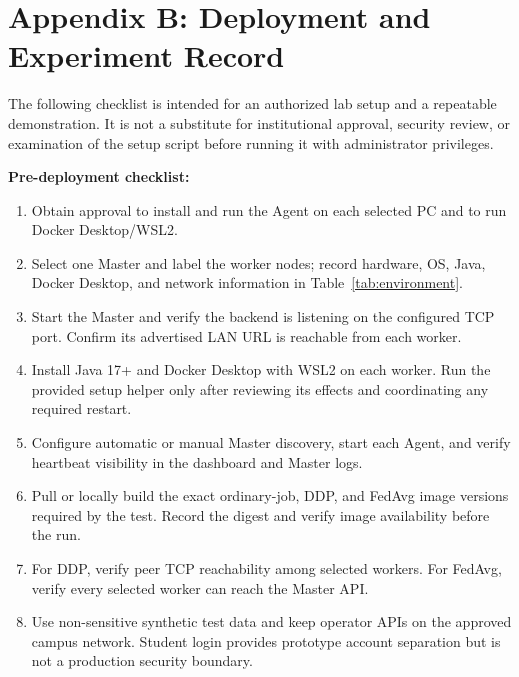 \documentclass{article}
\begin{document}
\pagebreak
\section{Appendix B: Deployment and Experiment Record}
The following checklist is intended for an authorized lab setup and a repeatable demonstration. It is not a substitute for institutional approval, security review, or examination of the setup script before running it with administrator privileges.

\textbf{Pre-deployment checklist:}
\begin{enumerate}
  \item Obtain approval to install and run the Agent on each selected PC and to run Docker Desktop/WSL2.
  \item Select one Master and label the worker nodes; record hardware, OS, Java, Docker Desktop, and network information in Table~\ref{tab:environment}.
  \item Start the Master and verify the backend is listening on the configured TCP port. Confirm its advertised LAN URL is reachable from each worker.
  \item Install Java 17+ and Docker Desktop with WSL2 on each worker. Run the provided setup helper only after reviewing its effects and coordinating any required restart.
  \item Configure automatic or manual Master discovery, start each Agent, and verify heartbeat visibility in the dashboard and Master logs.
  \item Pull or locally build the exact ordinary-job, DDP, and FedAvg image versions required by the test. Record the digest and verify image availability before the run.
  \item For DDP, verify peer TCP reachability among selected workers. For FedAvg, verify every selected worker can reach the Master API.
  \item Use non-sensitive synthetic test data and keep operator APIs on the approved campus network. Student login provides prototype account separation but is not a production security boundary.
\end{enumerate}
\end{document}
